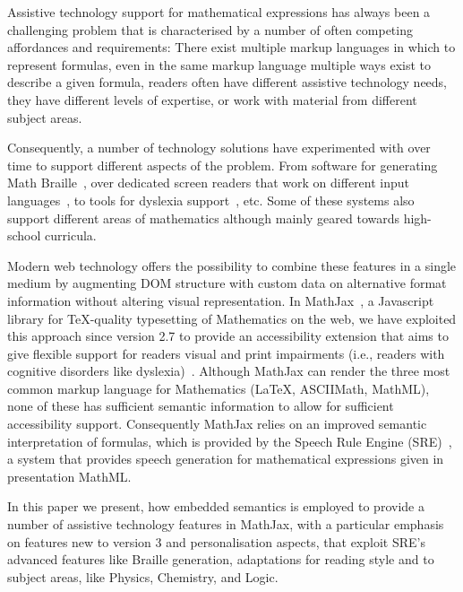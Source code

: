 \documentclass{sig-alternate}
\begin{document}
Assistive technology support for mathematical expressions has always been a
challenging problem that is characterised by a number of often competing
affordances and requirements: There exist multiple markup languages in which to
represent formulas, even in the same markup language multiple ways exist to
describe a given formula, readers often have different assistive technology
needs, they have different levels of expertise, or work with material from
different subject areas.

Consequently, a number of technology solutions have experimented with over time
to support different aspects of the problem. From software for generating Math
Braille~\cite{maddox2007mathematical}, over dedicated screen readers that work
on different input languages~\cite{raman1994aster,soiffer2005mathplayer}, to
tools for dyslexia support~\cite{equatio}, etc. Some of these systems also
support different areas of mathematics although mainly geared towards
high-school curricula.

Modern web technology offers the possibility to combine these features in a
single medium by augmenting DOM structure with custom data on alternative format
information without altering visual representation. In
MathJax~\cite{MathJax2.7}, a Javascript library for TeX-quality typesetting of
Mathematics on the web, we have exploited this approach since version 2.7 to
provide an accessibility extension that aims to give flexible support for
readers visual and print impairments (i.e., readers with cognitive disorders
like dyslexia)~\cite{cervone2016towards}.  Although MathJax can render the three
most common markup language for Mathematics ({\LaTeX}, ASCIIMath, MathML),
none of these has sufficient semantic information to allow for sufficient
accessibility support. Consequently MathJax relies on an improved semantic
interpretation of formulas, which is provided by the Speech Rule Engine
(SRE)~\cite{SRE}, a system that provides speech generation for mathematical
expressions given in presentation MathML.

In this paper we present, how embedded semantics is employed to provide a number
of assistive technology features in MathJax, with a particular emphasis on
features new to version 3 and personalisation aspects, that exploit SRE's
advanced features like Braille generation, adaptations for reading style and to
subject areas, like Physics, Chemistry, and Logic.


\end{document}
